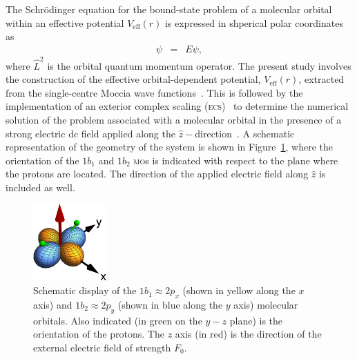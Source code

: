 The Schr\"{o}dinger equation for the bound-state problem of a
molecular orbital within an effective potential $V_{\mathrm{eff}}(r)$
is expressed in shperical polar coordinates as
%
\begin{eqnarray}
  [ -\frac{1}{2} \frac{d^2}{dr^2} + \frac{\hat{L}^2}{2r^2} + V_{\rm{eff}}(r)] \psi
  & = & E\psi,
\label{eq:sch_noCS}
\end{eqnarray}
%
where $\hat{L}^{2}$ is the orbital quantum momentum operator. The
present study involves the construction of the effective
orbital-dependent potential, $V_{\mathrm{eff}}(r)$, extracted from the
single-centre Moccia wave functions~\cite{Moccia_1964}. This is
followed by the implementation of an exterior complex scaling
(\textsc{ecs})~\cite{Simon_1979} to determine the numerical solution
of the problem associated with a molecular orbital in the presence of
a strong electric dc field applied along the
$\hat{z}-$direction~\cite{sarias_2016}. A schematic representation of
the geometry of the system is shown in Figure~\ref{fig:h2o_1b1_1b2},
where the orientation of the $1b_{1}$ and $1b_{2}$ \textsc{mo}s is
indicated with respect to the plane where the protons are located. The
direction of the applied electric field along $\hat{z}$ is included as
well.

\begin{figure}
  \centering
  \includegraphics[width=0.25\textwidth]{figures/ch_H2O/1b1_1b2/orbitals.eps}
  \caption{Schematic display of the $1b_{1}\approx 2p_{x}$ (shown in
    yellow along the $x$ axis) and $1b_{2}\approx 2p_{y}$ (shown in
    blue along the $y$ axis) molecular orbitals. Also indicated (in
    green on the $y-z$ plane) is the orientation of the protons. The
    $z$ axis (in red) is the direction of the external electric field
    of strength $F_{0}$.}
  \label{fig:h2o_1b1_1b2}
\end{figure}


